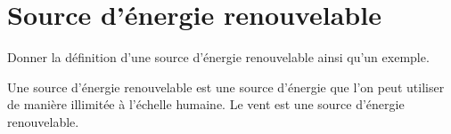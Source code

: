\section{Source d'énergie renouvelable}\label{ex:renouvelable}

Donner la définition d'une source d'énergie renouvelable ainsi qu'un exemple.

\begin{solution}
	Une source d'énergie renouvelable est une source d'énergie que l'on peut utiliser de manière illimitée à l'échelle humaine. Le vent est une source d'énergie renouvelable.
\end{solution}